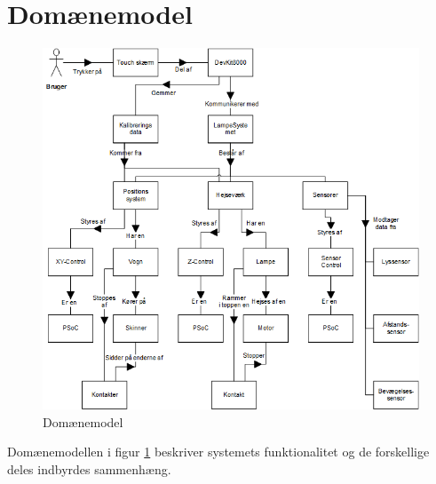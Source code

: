 \section{Domænemodel}

\begin{figure}[H] \centering
    \includegraphics[width=\textwidth]{0_Filer/Figuer/DomaenemodelLAMP.png}
    \caption{Domænemodel}
    \label{fig:domaenemodel}
\end{figure}


Domænemodellen i figur \ref{fig:domaenemodel} beskriver systemets funktionalitet og de forskellige deles indbyrdes sammenhæng.